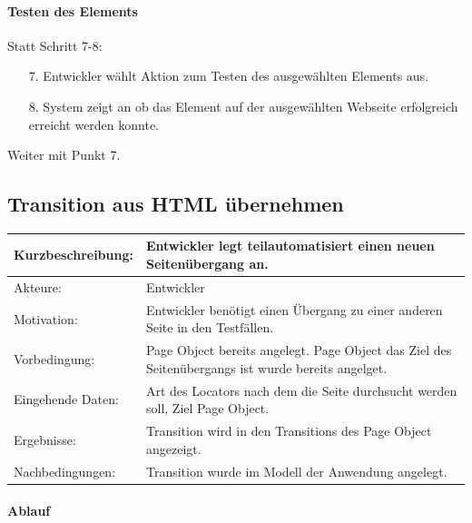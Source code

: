 \paragraph{Testen des Elements}
Statt Schritt 7-8:
\begin{itemize}
\item[7.] Entwickler wählt Aktion zum Testen des ausgewählten Elements aus. 
\item[8.] System zeigt an ob das Element auf der ausgewählten Webseite erfolgreich erreicht werden konnte. 
\end{itemize}
Weiter mit Punkt 7. 

\subsection{Transition aus HTML übernehmen}
\label{sec:Transition_from_html}

\begin{tabular}[h]{|p{4cm}|p{}|}
\hline 
\rule[-1ex]{0pt}{2.5ex}Kurzbeschreibung: & 
Entwickler legt teilautomatisiert einen neuen Seitenübergang an. \\  
\hline 
\rule[-1ex]{0pt}{2.5ex}Akteure: & 
Entwickler \\ 
\hline 
\rule[-1ex]{0pt}{2.5ex}Motivation: & 
Entwickler benötigt einen Übergang zu einer anderen Seite in den Testfällen. \\ 
\hline 
\rule[-1ex]{0pt}{2.5ex}Vorbedingung: & 
Page Object bereits angelegt. Page Object das Ziel des Seitenübergangs ist wurde bereits angelget. \\ 
\hline 
\rule[-1ex]{0pt}{2.5ex}Eingehende Daten: & Art des Locators nach dem die Seite durchsucht werden soll, Ziel Page Object. \\ 
\hline 
\rule[-1ex]{0pt}{2.5ex}Ergebnisse: & Transition wird in den Transitions des Page Object angezeigt. \\ 
\hline 
\rule[-1ex]{0pt}{2.5ex}Nachbedingungen: & Transition wurde im Modell der Anwendung angelegt.  \\ 
\hline 
\end{tabular} 

\paragraph{Ablauf}

